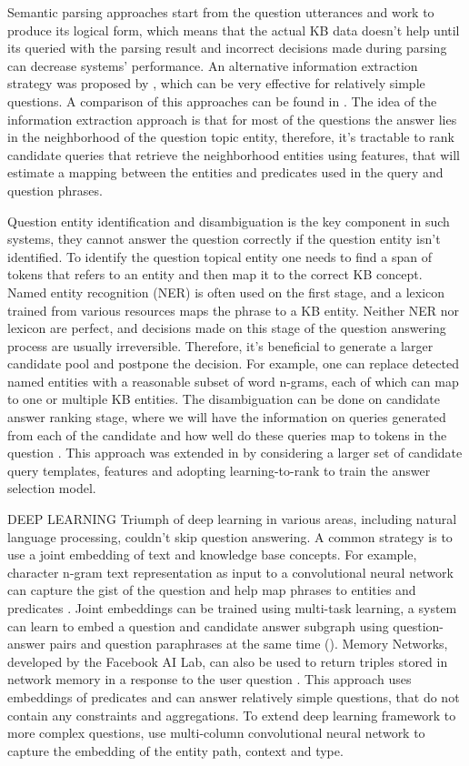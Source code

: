 Semantic parsing approaches start from the question utterances and work to produce its logical form, which means that the actual KB data doesn't help until its queried with the parsing result and incorrect decisions made during parsing can decrease systems' performance.
An alternative information extraction strategy was proposed by \cite{YaoD14}, which can be very effective for relatively simple questions.
A comparison of this approaches can be found in \cite{yao2014freebase}.
The idea of the information extraction approach is that for most of the questions the answer lies in the neighborhood of the question topic entity, therefore, it's tractable to rank candidate queries that retrieve the neighborhood entities using features, that will estimate a mapping between the entities and predicates used in the query and question phrases.

Question entity identification and disambiguation is the key component in such systems, they cannot answer the question correctly if the question entity isn't identified.
To identify the question topical entity one needs to find a span of tokens that refers to an entity and then map it to the correct KB concept.
Named entity recognition (NER) is often used on the first stage, and a lexicon trained from various resources maps the phrase to a KB entity.
Neither NER nor lexicon are perfect, and decisions made on this stage of the question answering process are usually irreversible.
Therefore, it's beneficial to generate a larger candidate pool and postpone the decision.
For example, one can replace detected named entities with a reasonable subset of word n-grams, each of which can map to one or multiple KB entities.
The disambiguation can be done on candidate answer ranking stage, where we will have the information on queries generated from each of the candidate and how well do these queries map to tokens in the question \cite{yao-scratch-qa-naacl2015}.
This approach was extended in \cite{bastmore:cikm:2015:aquu} by considering a larger set of candidate query templates, features and adopting learning-to-rank to train the answer selection model.

DEEP LEARNING
Triumph of deep learning in various areas, including natural language processing, couldn't skip question answering.
A common strategy is to use a joint embedding of text and knowledge base concepts.
For example, character n-gram text representation as input to a convolutional neural network can capture the gist of the question and help map phrases to entities and predicates \cite{yih2014semantic}.
Joint embeddings can be trained using multi-task learning, \eg a system can learn to embed a question and candidate answer subgraph using question-answer pairs and question paraphrases at the same time (\cite{BordesCW14:emnlp}).
Memory Networks, developed by the Facebook AI Lab, can also be used to return triples stored in network memory in a response to the user question \cite{bordes2015large}.
This approach uses embeddings of predicates and can answer relatively simple questions, that do not contain any constraints and aggregations.
To extend deep learning framework to more complex questions, \cite{dong2015question} use multi-column convolutional neural network to capture the embedding of the entity path, context and type.

